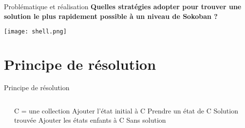     \begin{frame}{Problématique et réalisation}
        \centering
        \Large\textbf{Quelles stratégies adopter pour trouver une solution le plus rapidement possible à un niveau de Sokoban ?}

        \vspace{1.5cm} %
        \texttt{[image: shell.png]}
    \end{frame}

    \section{Principe de résolution}
        \begin{frame}{Principe de résolution}
            \begin{columns}
                \begin{column}{\paperwidth}
                    
                \end{column}

                \begin{column}{\paperwidth}
                    \begin{minipage}{\textwidth}
                        \begin{algorithmic}[1]
                            \State C = une collection
                            \State Ajouter l'état initial à C
                                \State Prendre un état de C
                                    \State Solution trouvée
                                \EndIf
                                \State Ajouter les états enfants à C
                            \EndWhile
                            \State Sans solution
                        \end{algorithmic}
                    \end{minipage}
                \end{column}
            \end{columns}
        \end{frame}

